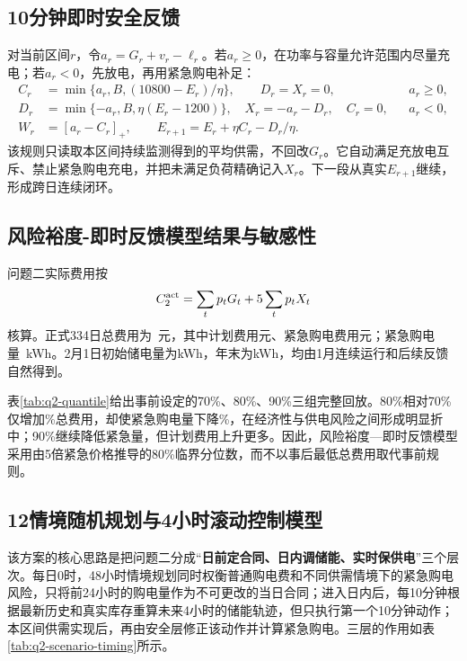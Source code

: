 \documentclass[UTF8,fontset=none,12pt,a4paper]{ctexart}
\newcommand{\sourceinput}[1]{}
\begin{document}
\subsection{10分钟即时安全反馈}
对当前区间$r$，令$a_r=G_r+v_r-\ell_r$。若$a_r\ge0$，在功率与容量允许范围内尽量充电；若$a_r<0$，先放电，再用紧急购电补足：
\begin{align}
 C_r&=\min\{a_r,B,(10800-E_r)/\eta\},\qquad D_r=X_r=0,
 &&a_r\ge0,\nonumber\\
 D_r&=\min\{-a_r,B,\eta(E_r-1200)\},\quad X_r=-a_r-D_r,\quad C_r=0,
 &&a_r<0,\label{eq:q2feedback}\\
 W_r&=[a_r-C_r]_+,\qquad E_{r+1}=E_r+\eta C_r-D_r/\eta.\nonumber
\end{align}
该规则只读取本区间持续监测得到的平均供需，不回改$G_r$。它自动满足充放电互斥、禁止紧急购电充电，并把未满足负荷精确记入$X_r$。下一段从真实$E_{r+1}$继续，形成跨日连续闭环。

\subsection{风险裕度-即时反馈模型结果与敏感性}
问题二实际费用按
\begin{equation}
 C_2^{\rm act}=\sum_t p_tG_t+5\sum_t p_tX_t
 \label{eq:cost2}
\end{equation}
核算。正式334日总费用为\QTwoCost\ 元，其中计划费用\QTwoPlanCost 元、紧急购电费用\QTwoEmergencyCost 元；紧急购电量\QTwoEmergencyEnergy\ kWh。2月1日初始储电量为\QTwoInitialSOC kWh，年末为\QTwoFinalSOC kWh，均由1月连续运行和后续反馈自然得到。

表\ref{tab:q2-quantile}给出事前设定的70\%、80\%、90\%三组完整回放。80\%相对70\%仅增加\QTwoVsSeventyCostPct\%总费用，却使紧急购电量下降\QTwoVsSeventyEmergencyPct\%，在经济性与供电风险之间形成明显折中；90\%继续降低紧急量，但计划费用上升更多。因此，风险裕度—即时反馈模型采用由5倍紧急价格推导的80\%临界分位数，而不以事后最低总费用取代事前规则。
\sourceinput{q2_sensitivity}

\subsection{12情境随机规划与4小时滚动控制模型}
该方案的核心思路是把问题二分成“\textbf{日前定合同、日内调储能、实时保供电}”三个层次。每日0时，48小时情境规划同时权衡普通购电费和不同供需情境下的紧急购电风险，只将前24小时的购电量作为不可更改的当日合同；进入日内后，每10分钟根据最新历史和真实库存重算未来4小时的储能轨迹，但只执行第一个10分钟动作；本区间供需实现后，再由安全层修正该动作并计算紧急购电。三层的作用如表\ref{tab:q2-scenario-timing}所示。
\end{document}
